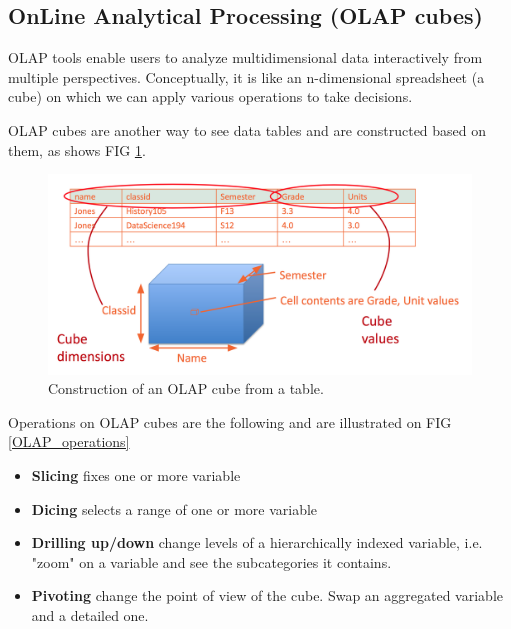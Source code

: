 \subsection{OnLine Analytical Processing (OLAP cubes)}

OLAP tools enable users to analyze multidimensional data interactively from multiple perspectives. Conceptually, it is like an n-dimensional spreadsheet (a cube) on which we can apply various operations to take decisions.

OLAP cubes are another way to see data tables and are constructed based on them, as shows FIG \ref{OLAP_cubes}.

\begin{figure}[H]%
 \centering
 \includegraphics[width=12cm]{./img/02/OLAP_cube}
 \caption{\label{OLAP_cubes} Construction of an OLAP cube from a table.}
\end{figure}

Operations on OLAP cubes are the following and are illustrated on FIG \ref{OLAP_operations}
\begin{itemize}
	\item \textbf{Slicing} fixes one or more variable
	\item \textbf{Dicing} selects a range of one or more variable
	\item \textbf{Drilling up/down} change levels of a hierarchically indexed variable, i.e. "zoom" on a variable and see the subcategories it contains.
	\item \textbf{Pivoting} change the point of view of the cube. Swap an aggregated variable and a detailed one.
\end{itemize}

